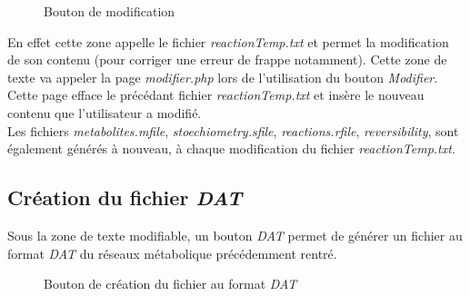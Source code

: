 \begin{figure}[!ht]
	\begin{center}
		\caption{Bouton de modification}
  		\label{boutonModif}
  	\end{center}	
\end{figure}

En effet cette zone appelle le fichier \emph{reactionTemp.txt} et permet la modification de son contenu (pour corriger une erreur de frappe notamment). Cette zone de texte va appeler la page \emph{modifier.php} lors de l'utilisation du bouton \emph{Modifier}.\\
 Cette page efface le précédant fichier \emph{reactionTemp.txt} et insère le nouveau contenu que l'utilisateur a modifié. \\
 Les fichiers \emph{metabolites.mfile}, \emph{stoechiometry.sfile}, \emph{reactions.rfile}, \emph{reversibility}, sont également générés à nouveau, à chaque modification du fichier \emph{reactionTemp.txt}.
 
\subsection{Création du fichier \emph{DAT}}
Sous la zone de texte modifiable, un bouton \emph{DAT} permet de générer un fichier au format \emph{DAT} du réseaux métabolique précédemment rentré. \\

\begin{figure}[!ht]
	\begin{center}
		\caption{Bouton de création du fichier au format \emph{DAT}}
  		\label{boutonDAT}
  	\end{center}	
\end{figure}


